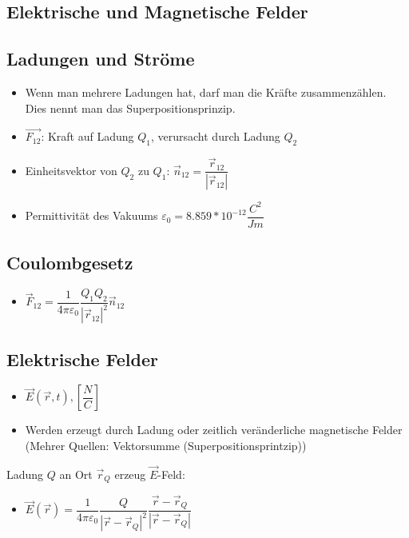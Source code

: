 \documentclass[6pt,a4paper]{scrartcl}
\begin{document}
\begin{multicols*}{4}
		\section{Elektrische und Magnetische Felder}

			\subsection{Ladungen und Ströme}
				\begin{itemize}\itemsep0pt
					\item Wenn man mehrere Ladungen hat, darf man die Kräfte zusammenzählen. Dies nennt man das Superpositionsprinzip.
					\item $\overrightarrow{F_{12}}$: Kraft auf Ladung $Q_{1}$, verursacht durch Ladung $Q_{2}$
					\item Einheitsvektor von $Q_{2}$ zu $Q_{1}$: $\overrightarrow{n}_{12} = \dfrac{\overrightarrow{r}_{12}}{|\overrightarrow{r}_{12}|}$
					\item Permittivität des Vakuums $ \varepsilon_{0}=8.859*10^{-12}\dfrac{C^{2}}{Jm}$
				\end{itemize}
			
			
			
			
			
			\subsection{Coulombgesetz}
				\begin{itemize}\itemsep0pt
					\item $\overrightarrow{F}_{12}=\dfrac{1}{4\pi\varepsilon_{0}}\dfrac{Q_{1}Q_{2}}{|\overrightarrow{r}_{12}|^{2}}\overrightarrow{n}_{12}$
				\end{itemize}
			
			\subsection{Elektrische Felder}
			
				\begin{itemize}\itemsep0pt
					\item $\overrightarrow{E}(\overrightarrow{r},t), [\dfrac{N}{C}]$
					\item Werden erzeugt durch Ladung oder zeitlich veränderliche magnetische Felder (Mehrer Quellen: Vektorsumme (Superpositionsprintzip))
				\end{itemize}
			
				Ladung $Q$ an Ort $\overrightarrow{r}_{Q}$ erzeug $\overrightarrow{E}$-Feld:		
				\begin{itemize}\itemsep0pt
					\item $\overrightarrow{E}(\overrightarrow{r}) = \dfrac{1}{4\pi\varepsilon_{0}} \dfrac{Q}{|\overrightarrow{r}-\overrightarrow{r}_{Q}|^{2}}  \dfrac{\overrightarrow{r}-\overrightarrow{r}_{Q}}{|\overrightarrow{r}-\overrightarrow{r}_{Q}|}$
					

\end{itemize}
\end{multicols*}
\end{document}
